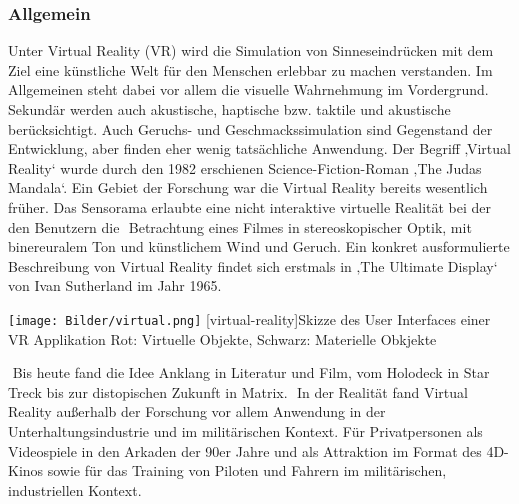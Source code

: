 \documentclass[12pt,a4paper,bibliography=totocnumbered,listof=totocnumbered]{scrartcl}
\begin{document}
\subsubsection{Allgemein}
Unter Virtual Reality (\ac{VR}) wird die Simulation von Sinneseindrücken mit dem Ziel eine künstliche Welt für den Menschen erlebbar zu machen verstanden. Im Allgemeinen steht dabei vor allem die visuelle Wahrnehmung im Vordergrund. Sekundär werden auch akustische, haptische bzw. taktile und akustische berücksichtigt. Auch Geruchs- und Geschmackssimulation sind Gegenstand der Entwicklung, aber finden eher wenig tatsächliche Anwendung.
Der Begriff ‚Virtual Reality‘ wurde durch den 1982 erschienen Science-Fiction-Roman ‚The Judas Mandala‘. Ein Gebiet der Forschung war die Virtual Reality bereits wesentlich früher.
Das Sensorama erlaubte eine nicht interaktive virtuelle Realität bei der den Benutzern die  Betrachtung eines Filmes in stereoskopischer Optik, mit binereuralem Ton und künstlichem Wind und Geruch. Ein konkret ausformulierte Beschreibung von Virtual Reality findet sich erstmals in ‚The Ultimate Display‘ von Ivan Sutherland im Jahr 1965.

\begin{minipage}{\linewidth}
\vspace{1em}
	\centering
	\texttt{[image: Bilder/virtual.png]}
	[virtual-reality]{Skizze des User Interfaces einer VR Applikation\newline
	Rot: Virtuelle Objekte, Schwarz: Materielle Obkjekte}
	\label{fig:virtual_reality}
\vspace{1em}
\end{minipage}

 Bis heute fand die Idee Anklang in Literatur und Film, vom Holodeck in Star Treck bis zur distopischen Zukunft in Matrix.  In der Realität fand Virtual Reality außerhalb der Forschung vor allem Anwendung in der Unterhaltungsindustrie und im militärischen Kontext. Für Privatpersonen als Videospiele in den Arkaden der 90er Jahre und als Attraktion im Format des 4D-Kinos sowie für das Training von Piloten und Fahrern im militärischen, industriellen Kontext.
\end{document}
